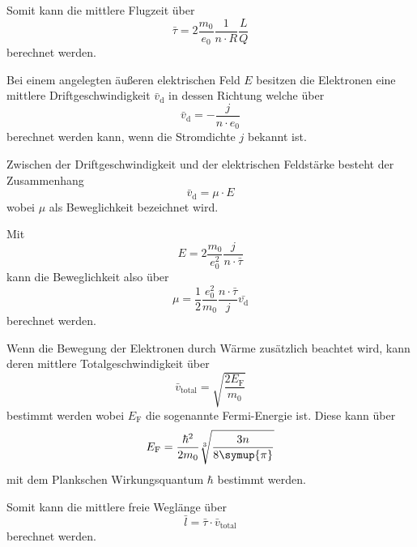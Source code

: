 Somit kann die mittlere Flugzeit über 
\begin{equation}
    \bar{\tau} = 2\frac{m_0}{e_0}\frac{1}{n \cdot R}\frac{L}{Q}
\end{equation}
berechnet werden. \cite{V311}

Bei einem angelegten äußeren elektrischen Feld $E$ besitzen die Elektronen eine mittlere Driftgeschwindigkeit $\bar{v}_\text{d}$ in dessen Richtung welche über 
\begin{equation}
    \bar{v}_\text{d} = -\frac{j}{n \cdot e_0}
    \label{eq:driftgeschwindigkeit}
\end{equation}
berechnet werden kann, wenn die Stromdichte $j$ bekannt ist. \cite{V311}

Zwischen der Driftgeschwindigkeit und der elektrischen Feldstärke besteht der Zusammenhang
\begin{equation}
    \bar{v}_\text{d} = \mu \cdot E
\end{equation}
wobei $\mu$ als Beweglichkeit bezeichnet wird. \cite{V311}

Mit 
\begin{equation}
    E = 2 \frac{m_0}{e_0^2}\frac{j}{n\cdot\bar{\tau}}
\end{equation}
kann die Beweglichkeit also über
\begin{equation}
    \mu = \frac{1}{2}\frac{e_0^2}{m_0}\frac{n\cdot\bar{\tau}}{j} \bar{v_\text{d}}
    \label{eq:beweglichkeit}
\end{equation}
berechnet werden.

Wenn die Bewegung der Elektronen durch Wärme zusätzlich beachtet wird, kann deren mittlere Totalgeschwindigkeit über
\begin{equation}
    \bar{v}_\text{total} = \sqrt{\frac{2 E_\text{F}}{m_0}}
    \label{eq:totalgeschwindigkeit}
\end{equation}
bestimmt werden wobei $E_\text{F}$ die sogenannte Fermi-Energie ist.
Diese kann über 
\begin{equation}
    E_\text{F} = \frac{\hbar^2}{2 m_0}\sqrt[3]{\frac{3n}{8\symup{\pi}}}
    \label{eq:fermienergie}
\end{equation}
mit dem Plankschen Wirkungsquantum $\hbar$ bestimmt werden. \cite{V311}

Somit kann die mittlere freie Weglänge über
\begin{equation}
    \bar{l} = \bar{\tau} \cdot \bar{v}_\text{total}
\end{equation}
berechnet werden.

